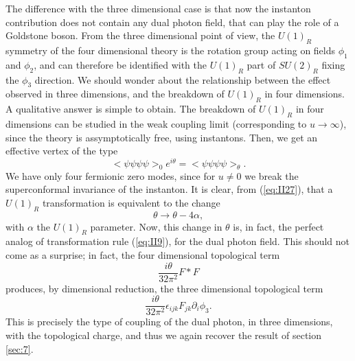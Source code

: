 The difference with the three dimensional case is that now the
instanton contribution does not contain any dual photon field,
that can play the role of a Goldstone boson. From the three
dimensional point of view, the $U(1)_R$ symmetry of the four
dimensional theory is the rotation group acting on fields
$\phi_1$ and $\phi_2$, and can therefore be identified with the
$U(1)_R$ part of $SU(2)_R$ fixing the $\phi_3$ direction. We
should wonder about the relationship between the effect observed in
three dimensions, and the breakdown of $U(1)_R$ in four
dimensions. A qualitative answer is simple to obtain. The
breakdown of $U(1)_R$ in four dimensions can be studied in the
weak coupling limit (corresponding to $u \rightarrow \infty$),
since the theory is assymptotically free, using instantons. Then, we
get an effective vertex of the type
\begin{equation}
<\psi \psi \psi \psi>_0 e^{i \theta} = < \psi \psi \psi \psi
>_{\theta}.
\label{eq:II27}
\end{equation}
We have only four fermionic zero modes, since for $u \neq 0$ we
break the superconformal invariance of the instanton. It is
clear, from (\ref{eq:II27}), that a $U(1)_R$ transformation is
equivalent to the change
\begin{equation}
\theta \rightarrow \theta - 4 \alpha,
\label{eq:II28}
\end{equation}
with $\alpha$ the $U(1)_R$ parameter. Now, this change in
$\theta$ is, in fact, the perfect analog of transformation rule
(\ref{eq:II9}), for the dual photon field.
This should not come as a surprise; in fact, the four dimensional
topological term
\begin{equation}
\frac {i \theta}{32 \pi^2} F *F
\label{eq:II29}
\end{equation}
produces, by dimensional reduction, the three dimensional
topological term
\begin{equation}
\frac {i \theta}{32 \pi^2} \epsilon_{ijk}F_{jk} \partial_i
\phi_3.
\label{eq:II30}
\end{equation}
This is precisely the type of coupling of the dual photon, in
three dimensions, with the topological charge, and thus we again
recover the result of section \ref{sec:7}. 
  
